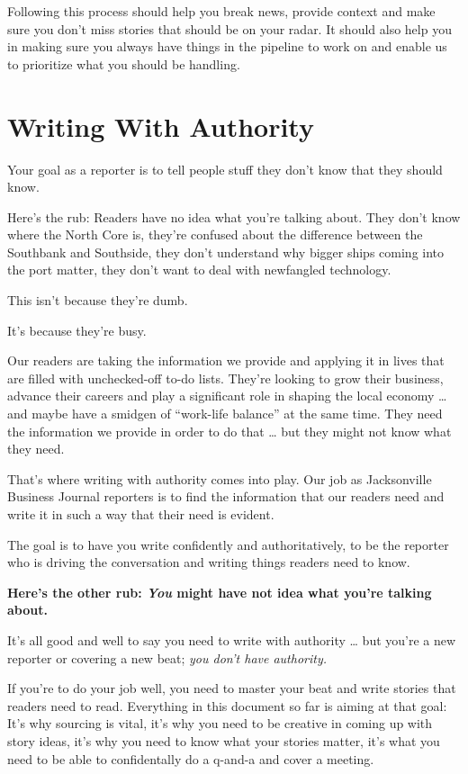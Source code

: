 \documentclass[
  11pt,
  american,
  letterpaperpaper,
  extrafontsizes,onecolumn,openright
  ]{memoir}
\begin{document}
Following this process should help you break news, provide context and make sure you don't miss stories that should be on your radar. It should also help you in making sure you always have things in the pipeline to work on and enable us to prioritize what you should be handling.

\hypertarget{writing-with-authority}{%
\chapter{Writing With Authority}\label{writing-with-authority}}

Your goal as a reporter is to tell people stuff they don't know that they should know.

Here's the rub: Readers have no idea what you're talking about. They don't know where the North Core is, they're confused about the difference between the Southbank and Southside, they don't understand why bigger ships coming into the port matter, they don't want to deal with newfangled technology.

This isn't because they're dumb.

It's because they're busy.

Our readers are taking the information we provide and applying it in lives that are filled with unchecked-off to-do lists. They're looking to grow their business, advance their careers and play a significant role in shaping the local economy \ldots{} and maybe have a smidgen of \enquote{work-life balance} at the same time. They need the information we provide in order to do that \ldots{} but they might not know what they need.

That's where writing with authority comes into play. Our job as Jacksonville Business Journal reporters is to find the information that our readers need and write it in such a way that their need is evident.

The goal is to have you write confidently and authoritatively, to be the reporter who is driving the conversation and writing things readers need to know.

\textbf{Here's the other rub: \emph{You} might have not idea what you're talking about.}

It's all good and well to say you need to write with authority \ldots{} but you're a new reporter or covering a new beat; \emph{you don't have authority.}

If you're to do your job well, you need to master your beat and write stories that readers need to read. Everything in this document so far is aiming at that goal: It's why sourcing is vital, it's why you need to be creative in coming up with story ideas, it's why you need to know what your stories matter, it's what you need to be able to confidentally do a q-and-a and cover a meeting.
\end{document}

